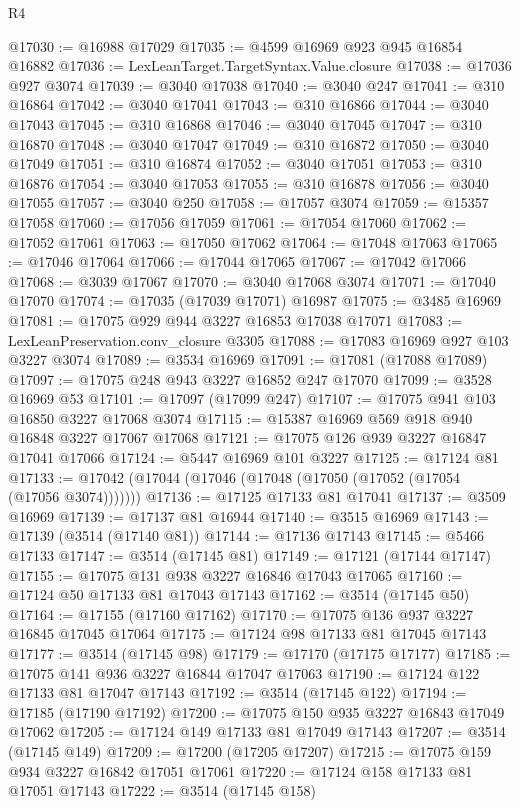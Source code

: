 \begin{lexlean}{R4}
\begin{coremodule}
@17030 := @16988 @17029
@17035 := @4599 @16969 @923 @945 @16854 @16882
@17036 := LexLeanTarget.TargetSyntax.Value.closure
@17038 := @17036 @927 @3074
@17039 := @3040 @17038
@17040 := @3040 @247
@17041 := @310 @16864
@17042 := @3040 @17041
@17043 := @310 @16866
@17044 := @3040 @17043
@17045 := @310 @16868
@17046 := @3040 @17045
@17047 := @310 @16870
@17048 := @3040 @17047
@17049 := @310 @16872
@17050 := @3040 @17049
@17051 := @310 @16874
@17052 := @3040 @17051
@17053 := @310 @16876
@17054 := @3040 @17053
@17055 := @310 @16878
@17056 := @3040 @17055
@17057 := @3040 @250
@17058 := @17057 @3074
@17059 := @15357 @17058
@17060 := @17056 @17059
@17061 := @17054 @17060
@17062 := @17052 @17061
@17063 := @17050 @17062
@17064 := @17048 @17063
@17065 := @17046 @17064
@17066 := @17044 @17065
@17067 := @17042 @17066
@17068 := @3039 @17067
@17070 := @3040 @17068 @3074
@17071 := @17040 @17070
@17074 := @17035 (@17039 @17071) @16987
@17075 := @3485 @16969
@17081 := @17075 @929 @944 @3227 @16853 @17038 @17071
@17083 := LexLeanPreservation.conv_closure @3305
@17088 := @17083 @16969 @927 @103 @3227 @3074
@17089 := @3534 @16969
@17091 := @17081 (@17088 @17089)
@17097 := @17075 @248 @943 @3227 @16852 @247 @17070
@17099 := @3528 @16969 @53
@17101 := @17097 (@17099 @247)
@17107 := @17075 @941 @103 @16850 @3227 @17068 @3074
@17115 := @15387 @16969 @569 @918 @940 @16848 @3227 @17067 @17068
@17121 := @17075 @126 @939 @3227 @16847 @17041 @17066
@17124 := @5447 @16969 @101 @3227
@17125 := @17124 @81
@17133 := @17042 (@17044 (@17046 (@17048 (@17050 (@17052 (@17054 (@17056 @3074)))))))
@17136 := @17125 @17133 @81 @17041
@17137 := @3509 @16969
@17139 := @17137 @81 @16944
@17140 := @3515 @16969
@17143 := @17139 (@3514 (@17140 @81))
@17144 := @17136 @17143
@17145 := @5466 @17133
@17147 := @3514 (@17145 @81)
@17149 := @17121 (@17144 @17147)
@17155 := @17075 @131 @938 @3227 @16846 @17043 @17065
@17160 := @17124 @50 @17133 @81 @17043 @17143
@17162 := @3514 (@17145 @50)
@17164 := @17155 (@17160 @17162)
@17170 := @17075 @136 @937 @3227 @16845 @17045 @17064
@17175 := @17124 @98 @17133 @81 @17045 @17143
@17177 := @3514 (@17145 @98)
@17179 := @17170 (@17175 @17177)
@17185 := @17075 @141 @936 @3227 @16844 @17047 @17063
@17190 := @17124 @122 @17133 @81 @17047 @17143
@17192 := @3514 (@17145 @122)
@17194 := @17185 (@17190 @17192)
@17200 := @17075 @150 @935 @3227 @16843 @17049 @17062
@17205 := @17124 @149 @17133 @81 @17049 @17143
@17207 := @3514 (@17145 @149)
@17209 := @17200 (@17205 @17207)
@17215 := @17075 @159 @934 @3227 @16842 @17051 @17061
@17220 := @17124 @158 @17133 @81 @17051 @17143
@17222 := @3514 (@17145 @158)

\end{coremodule}
\end{lexlean}
